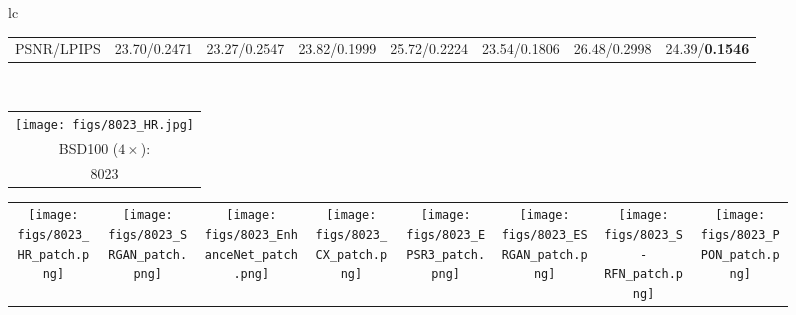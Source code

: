 \documentclass[preprint]{elsarticle}
\begin{document}
\begin{figure*}[htpb]
{\begin{tabular}{lc}
\begin{adjustbox}{valign=t}
\begin{tabular}{cccccccc}
					PSNR/LPIPS & \hspace{-3mm} 23.70/0.2471 & \hspace{-3mm} 23.27/0.2547 & \hspace{-3mm} 23.82/0.1999 & \hspace{-3mm} 25.72/0.2224 & \hspace{-3mm} 23.54/0.1806 & \hspace{-3mm} 26.48/0.2998 & \hspace{-3mm} 24.39/\textbf{0.1546} \\
				\end{tabular}
			\end{adjustbox}
			\\
			
			\begin{adjustbox}{valign=t}
				\scriptsize
				\begin{tabular}{c}
					\texttt{[image: figs/8023\_HR.jpg]} \\
					BSD100 ($4 \times$): \\
					8023 \\
				\end{tabular}
			\end{adjustbox}
			\hspace{-3mm}
			\begin{adjustbox}{valign=t}
				\scriptsize
				\begin{tabular}{cccccccc}
					\texttt{[image: figs/8023\_HR\_patch.png]} &
					\hspace{-3mm}
					\texttt{[image: figs/8023\_SRGAN\_patch.png]} &
					\hspace{-3mm}
					\texttt{[image: figs/8023\_EnhanceNet\_patch.png]} &
					\hspace{-3mm}
					\texttt{[image: figs/8023\_CX\_patch.png]} &
					\hspace{-3mm}
					\texttt{[image: figs/8023\_EPSR3\_patch.png]} &
					\hspace{-3mm}
					\texttt{[image: figs/8023\_ESRGAN\_patch.png]} &
					\hspace{-3mm}
					\texttt{[image: figs/8023\_S-RFN\_patch.png]} &
					\hspace{-3mm}
					\texttt{[image: figs/8023\_PPON\_patch.png]} \\

\end{tabular}
\end{adjustbox}
\end{tabular}}
\end{figure*}
\end{document}

